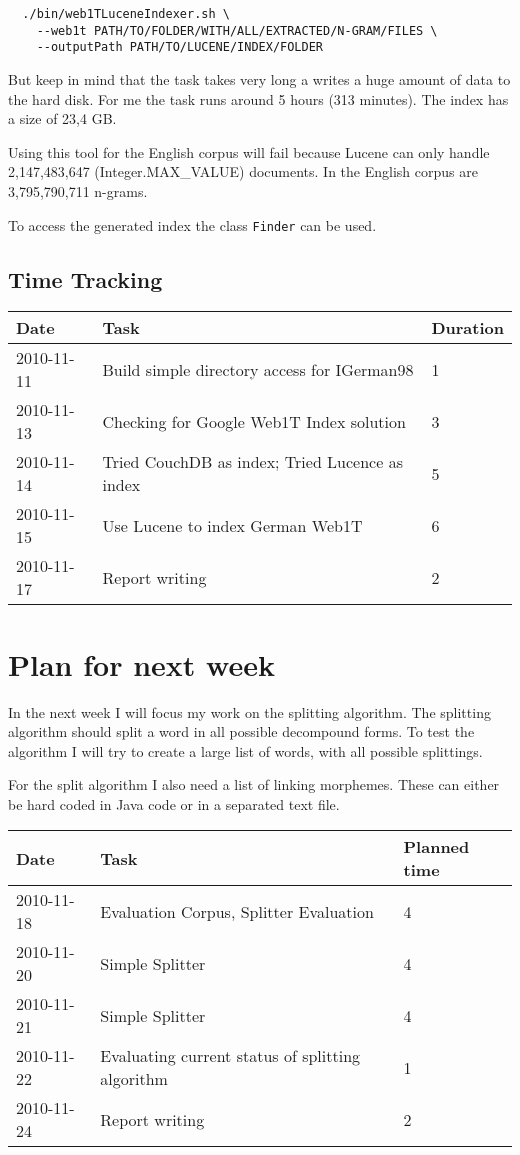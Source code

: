 \documentclass[11pt, accentcolor=tud9b, nochapname]{tudexercise}
\begin{document}
\begin{lstlisting}
  ./bin/web1TLuceneIndexer.sh \ 
    --web1t PATH/TO/FOLDER/WITH/ALL/EXTRACTED/N-GRAM/FILES \
    --outputPath PATH/TO/LUCENE/INDEX/FOLDER
\end{lstlisting}

But keep in mind that the task takes very long a writes a huge amount
of data to the hard disk. For me the task runs around 5 hours (313
minutes). The index has a size of 23,4 GB.

Using this tool for the English corpus will fail because Lucene can
only handle 2,147,483,647 (Integer.MAX\_VALUE) documents. In the
English corpus are 3,795,790,711 n-grams.

To access the generated index the class \texttt{Finder} can be used.

\subsection{Time Tracking}

\begin{tabular}{l | l | l}
  \hline
  \textbf{Date} & \textbf{Task} & \textbf{Duration} \\ \hline
  2010-11-11 & Build simple directory access for IGerman98 & 1 \\ \hline
  2010-11-13 & Checking for Google Web1T Index solution & 3 \\ \hline
  2010-11-14 & Tried CouchDB as index; Tried Lucence as index & 5 \\ \hline
  2010-11-15 & Use Lucene to index German Web1T & 6 \\ \hline
  2010-11-17 & Report writing & 2 \\ \hline
\end{tabular}

\section{Plan for next week}
In the next week I will focus my work on the splitting algorithm. The
splitting algorithm should split a word in all possible decompound
forms. To test the algorithm I will try to create a large list of
words, with all possible splittings.

For the split algorithm I also need a list of linking morphemes. These can either be hard coded in Java code or in a separated text file.

\vspace{10pt}
\begin{tabular}{l | l | l}
  \hline
  \textbf{Date} & \textbf{Task} & \textbf{Planned time} \\ \hline
  2010-11-18 & Evaluation Corpus, Splitter Evaluation & 4 \\ \hline
  2010-11-20 & Simple Splitter & 4 \\ \hline
  2010-11-21 & Simple Splitter & 4 \\ \hline
  2010-11-22 & Evaluating current status of splitting algorithm & 1 \\ \hline
  2010-11-24 & Report writing & 2 \\ \hline
\end{tabular}
\end{document}
